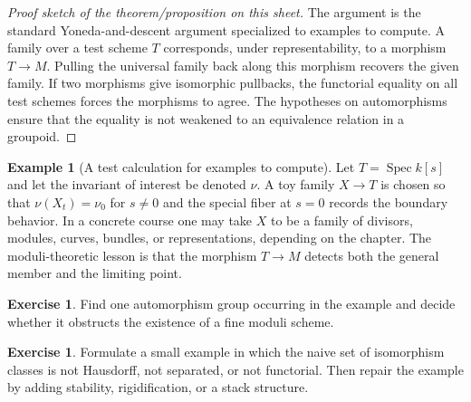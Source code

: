 \documentclass[11pt]{amsart}
\theoremstyle{definition}
\newtheorem{example}[theorem]{Example}
\newtheorem{exercise}[theorem]{Exercise}
\newcommand{\Spec}{\operatorname{Spec}}
\begin{document}
\begin{proof}[Proof sketch of the theorem/proposition on this sheet]
The argument is the standard Yoneda-and-descent argument specialized to examples to compute.  A family over a test scheme $T$ corresponds, under representability, to a morphism $T\to M$.  Pulling the universal family back along this morphism recovers the given family.  If two morphisms give isomorphic pullbacks, the functorial equality on all test schemes forces the morphisms to agree.  The hypotheses on automorphisms ensure that the equality is not weakened to an equivalence relation in a groupoid.
\end{proof}
\begin{example}[A test calculation for examples to compute]
Let $T=\Spec k[s]$ and let the invariant of interest be denoted $\nu$.  A toy family $X\to T$ is chosen so that $\nu(X_t)=\nu_0$ for $s\ne0$ and the special fiber at $s=0$ records the boundary behavior.  In a concrete course one may take $X$ to be a family of divisors, modules, curves, bundles, or representations, depending on the chapter.  The moduli-theoretic lesson is that the morphism $T\to M$ detects both the general member and the limiting point.
\end{example}
\begin{exercise}
Find one automorphism group occurring in the example and decide whether it obstructs the existence of a fine moduli scheme.
\end{exercise}
\begin{exercise}
Formulate a small example in which the naive set of isomorphism classes is not Hausdorff, not separated, or not functorial.  Then repair the example by adding stability, rigidification, or a stack structure.
\end{exercise}
\clearpage
\end{document}
